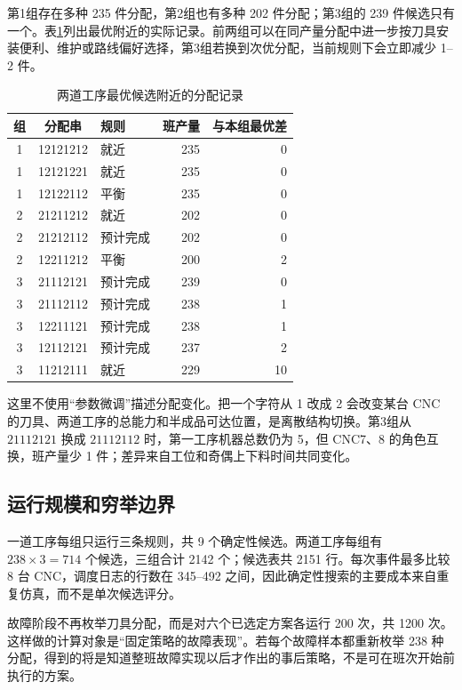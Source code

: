 \documentclass[UTF8,11pt,a4paper]{ctexart}
\begin{document}
第1组存在多种 235 件分配，第2组也有多种 202 件分配；第3组的 239 件候选只有一个。表\ref{tab:best-neighborhood-b}列出最优附近的实际记录。前两组可以在同产量分配中进一步按刀具安装便利、维护或路线偏好选择，第3组若换到次优分配，当前规则下会立即减少 1--2 件。

\begin{table}[H]
\centering
\caption{两道工序最优候选附近的分配记录}
\label{tab:best-neighborhood-b}
\small
\begin{tabular}{cclrr}
\toprule
组 & 分配串 & 规则 & 班产量 & 与本组最优差\\
\midrule
1 & 12121212 & 就近 & 235 & 0\\
1 & 12121221 & 就近 & 235 & 0\\
1 & 12122112 & 平衡 & 235 & 0\\
2 & 21211212 & 就近 & 202 & 0\\
2 & 21212112 & 预计完成 & 202 & 0\\
2 & 12211212 & 平衡 & 200 & 2\\
3 & 21112121 & 预计完成 & 239 & 0\\
3 & 21112112 & 预计完成 & 238 & 1\\
3 & 12211121 & 预计完成 & 238 & 1\\
3 & 12112121 & 预计完成 & 237 & 2\\
3 & 11212111 & 就近 & 229 & 10\\
\bottomrule
\end{tabular}
\end{table}

这里不使用“参数微调”描述分配变化。把一个字符从 1 改成 2 会改变某台 CNC 的刀具、两道工序的总能力和半成品可达位置，是离散结构切换。第3组从 $21112121$ 换成 $21112112$ 时，第一工序机器总数仍为 5，但 CNC7、8 的角色互换，班产量少 1 件；差异来自工位和奇偶上下料时间共同变化。

\subsection{运行规模和穷举边界}

一道工序每组只运行三条规则，共 9 个确定性候选。两道工序每组有 $238\times3=714$ 个候选，三组合计 2142 个；候选表共 2151 行。每次事件最多比较 8 台 CNC，调度日志的行数在 345--492 之间，因此确定性搜索的主要成本来自重复仿真，而不是单次候选评分。

故障阶段不再枚举刀具分配，而是对六个已选定方案各运行 200 次，共 1200 次。这样做的计算对象是“固定策略的故障表现”。若每个故障样本都重新枚举 238 种分配，得到的将是知道整班故障实现以后才作出的事后策略，不是可在班次开始前执行的方案。
\end{document}

